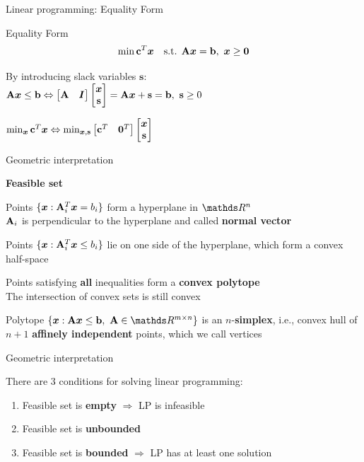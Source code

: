 \documentclass[11pt,compress,t,notes=noshow, xcolor=table]{beamer}
\begin{document}
\begin{framei}{Linear programming: Equality Form}
\item Equality Form
$$
\min \mathbf{c}^T\bm{x} \quad \text{s.t. } \mathbf{A}\bm{x} = \mathbf{b},\ \bm{x} \ge \mathbf{0}
$$
\item By introducing slack variables $\mathbf{s}$:\\
$\Amat\xv \le \mathbf{b} \Leftrightarrow \begin{bmatrix} \Amat & \id \end{bmatrix} \begin{bmatrix} \xv \\ \mathbf{s} \end{bmatrix} = \Amat\xv + \mathbf{s} = \mathbf{b},\ \mathbf{s} \ge 0$
\item $\min_{\bm{x}} \mathbf{c}^T\bm{x} \Leftrightarrow \min_{\bm{x},\mathbf{s}} \begin{bmatrix} \mathbf{c}^T & \mathbf{0}^T \end{bmatrix} \begin{bmatrix} \bm{x} \\ \mathbf{s} \end{bmatrix}$
\end{framei}


\begin{framei}{Geometric interpretation}
\item[] \textbf{Feasible set}
\item Points $\{\bm{x}: \mathbf{A}_i^T \bm{x} = b_i\}$ form a hyperplane in $\R^n$\\
$\mathbf{A}_i$ is perpendicular to the hyperplane and called \textbf{normal vector}
\item Points $\{\bm{x}: \mathbf{A}_i^T \bm{x} \le b_i\}$ lie on one side of the hyperplane, which form a convex half-space
\item Points satisfying \textbf{all} inequalities form a \textbf{convex polytope}\\
The intersection of convex sets is still convex
\vfill
\item Polytope $\{\xv: \Amat \xv \le \mathbf{b},\ \Amat \in \R^{m \times n}\}$ is an $n$-\textbf{simplex}, i.e., convex hull of $n + 1$ \textbf{affinely independent} points, which we call vertices
\end{framei}


\begin{framei}{Geometric interpretation}
\item There are 3 conditions for solving linear programming:
\begin{enumerate}
\item Feasible set is \textbf{empty} $\Rightarrow$ LP is infeasible
\item Feasible set is \textbf{unbounded}
\item Feasible set is \textbf{bounded} $\Rightarrow$ LP has at least one solution
\end{enumerate}
\end{framei}
\end{document}

